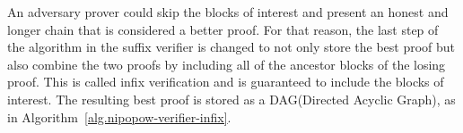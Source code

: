 An adversary prover could skip the blocks of interest and present an honest and
longer chain that is considered a better proof. For that reason, the last step
of the algorithm in the suffix verifier is changed to not only store the best
proof but also combine the two proofs by including all of the ancestor blocks
of the losing proof. This is called infix verification and is guaranteed to
include the blocks of interest. The resulting best proof is stored as a
DAG(Directed Acyclic Graph), as in Algorithm~\ref{alg.nipopow-verifier-infix}.


